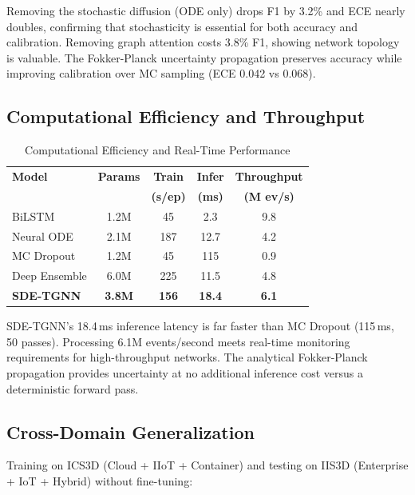 \documentclass[10pt,journal,compsoc]{IEEEtran}
\begin{document}
Removing the stochastic diffusion (ODE only) drops F1 by 3.2\% and ECE nearly doubles, confirming that stochasticity is essential for both accuracy and calibration. Removing graph attention costs 3.8\% F1, showing network topology is valuable. The Fokker-Planck uncertainty propagation preserves accuracy while improving calibration over MC sampling (ECE 0.042 vs 0.068).

\vspace{-0.2cm}
\subsection{Computational Efficiency and Throughput}

\begin{table}[!t]
\centering
\caption{Computational Efficiency and Real-Time Performance}
\label{tab:efficiency}
\small
\begin{tabular}{@{}lcccc@{}}
\toprule
\textbf{Model} & \textbf{Params} & \textbf{Train} & \textbf{Infer} & \textbf{Throughput} \\
 & & \textbf{(s/ep)} & \textbf{(ms)} & \textbf{(M ev/s)} \\
\midrule
BiLSTM & 1.2M & 45 & 2.3 & 9.8 \\
Neural ODE & 2.1M & 187 & 12.7 & 4.2 \\
MC Dropout & 1.2M & 45 & 115 & 0.9 \\
Deep Ensemble & 6.0M & 225 & 11.5 & 4.8 \\
\textbf{SDE-TGNN} & \textbf{3.8M} & \textbf{156} & \textbf{18.4} & \textbf{6.1} \\
\bottomrule
\end{tabular}
\end{table}

SDE-TGNN's 18.4\,ms inference latency is far faster than MC Dropout (115\,ms, 50 passes). Processing 6.1M events/second meets real-time monitoring requirements for high-throughput networks. The analytical Fokker-Planck propagation provides uncertainty at no additional inference cost versus a deterministic forward pass.

\vspace{-0.2cm}
\subsection{Cross-Domain Generalization}

Training on ICS3D (Cloud + IIoT + Container) and testing on IIS3D (Enterprise + IoT + Hybrid) without fine-tuning:
\end{document}
